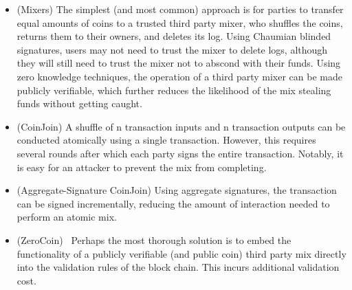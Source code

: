 \begin{itemize}
\item (Mixers) The simplest (and most common) approach is for parties to transfer equal amounts of coins to a trusted third party mixer, who shuffles the coins, returns them to their owners, and deletes its log. Using Chaumian blinded signatures, users may not need to trust the mixer to delete logs, although they will still need to trust the mixer not to abscond with their funds. Using zero knowledge techniques, the operation of a third party mixer can be made publicly verifiable, which further reduces the likelihood of the mix stealing funds without getting caught.
\item (CoinJoin) A shuffle of n transaction inputs and n transaction outputs can be conducted atomically using a single transaction. However, this requires several rounds after which each party signs the entire transaction. Notably, it is easy for an attacker to prevent the mix from completing.
\item (Aggregate-Signature CoinJoin) Using aggregate signatures, the transaction can be signed incrementally, reducing the amount of interaction needed to perform an atomic mix.
\item (ZeroCoin)~\cite{zerocoin} Perhaps the most thorough solution is to embed the functionality of a publicly verifiable (and public coin) third party mix directly into the validation rules of the block chain. This incurs additional validation cost.
\end{itemize}

